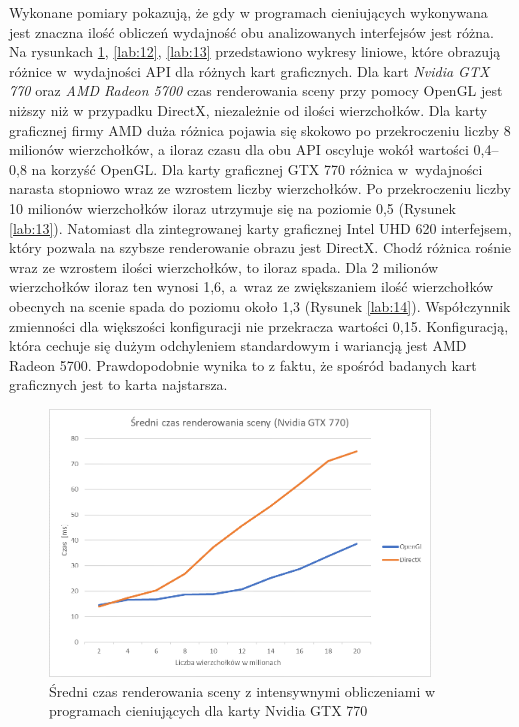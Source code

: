 \documentclass[archive]{mgr}
\begin{document}
Wykonane pomiary pokazują, że gdy w programach cieniujących wykonywana jest znaczna ilość obliczeń wydajność obu analizowanych interfejsów jest różna. Na rysunkach \ref{lab:11}, \ref{lab:12}, \ref{lab:13} przedstawiono wykresy liniowe, które obrazują różnice w~wydajności API dla różnych kart graficznych. Dla kart \emph{Nvidia GTX 770} oraz \emph{AMD Radeon 5700} czas renderowania sceny przy pomocy OpenGL jest niższy niż w przypadku DirectX, niezależnie od ilości wierzchołków. Dla karty graficznej firmy AMD duża różnica pojawia się skokowo po przekroczeniu liczby 8 milionów wierzchołków, a iloraz czasu dla obu API oscyluje wokół wartości 0,4–0,8 na korzyść OpenGL. Dla karty graficznej GTX 770 różnica w~wydajności narasta stopniowo wraz ze wzrostem liczby wierzchołków. Po przekroczeniu liczby 10 milionów wierzchołków iloraz utrzymuje się na poziomie 0,5 (Rysunek \ref{lab:13}). Natomiast dla zintegrowanej karty graficznej Intel UHD 620 interfejsem, który pozwala na szybsze renderowanie obrazu jest DirectX. Chodź różnica rośnie wraz ze wzrostem ilości wierzchołków, to iloraz spada. Dla 2 milionów wierzchołków iloraz ten wynosi 1,6, a~wraz ze zwiększaniem ilość wierzchołków obecnych na scenie spada do poziomu około 1,3 (Rysunek \ref{lab:14}). Współczynnik zmienności dla większości konfiguracji nie przekracza wartości 0,15. Konfiguracją, która cechuje się dużym odchyleniem standardowym i wariancją jest AMD Radeon 5700. Prawdopodobnie wynika to z faktu, że spośród badanych kart graficznych jest to karta najstarsza.



\begin{figure}[h!]
  \centering
    \includegraphics[width=0.9\textwidth]{images/shaderon/1.png}
   \caption{Średni czas renderowania sceny z intensywnymi obliczeniami w programach cieniujących dla karty Nvidia GTX 770}
   \label{lab:11}
\end{figure}
\newpage
\end{document}
